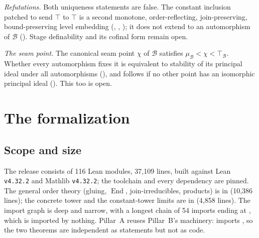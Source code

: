 \documentclass[11pt]{amsart}
\theoremstyle{plain}
\theoremstyle{definition}
\newcommand{\End}{\operatorname{End}}
\newcommand{\BB}{\mathcal{B}}
\begin{document}
\emph{Refutations.} Both uniqueness statements are false. The constant inclusion
patched to send $\top$ to $\top$ is a second monotone, order-reflecting,
join-preserving, bound-preserving level embedding
(, ,
); it does not extend to an
automorphism of $\BB$ (). Stage
definability and its cofinal form remain open.

\emph{The seam point.} The canonical seam point $\chi$ of $\BB$ satisfies
$\mu_\BB<\chi<\top_\BB$. Whether every automorphism fixes it is equivalent to
stability of its principal ideal under all automorphisms
(), and follows if no other point has
an isomorphic principal ideal ().
This too is open.

\section{The formalization}\label{sec:formal}

\subsection{Scope and size}
The release consists of 116 Lean modules, 37{,}109 lines, built against Lean
\texttt{v4.32.2} and Mathlib \texttt{v4.32.2}; the toolchain and every
dependency are pinned. The general order theory (gluing, $\End$,
join-irreducibles, products) is in  (10{,}386 lines);
the concrete tower and the constant-tower limits are in
 (4{,}858 lines). The import graph is deep and
narrow, with a longest chain of 54 imports ending at , which
is imported by nothing. Pillar~A reuses Pillar~B's machinery:
 imports , so the two theorems are
independent as statements but not as code.
\end{document}
